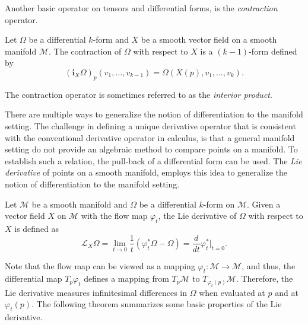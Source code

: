 Another basic operator on tensors and differential forms, is the \emph{contraction} operator.
\begin{definition}
	Let $\Omega$ be a differential $k$-form and $X$ be a smooth vector field on a smooth manifold $\mathcal M$. The contraction of $\Omega$ with respect to $X$ is a $(k-1)$-form defined by
\[
	(\mathbf i_{X}\Omega)_p(v_1,\dots,v_{k-1}) = \Omega(X(p),v_1,\dots,v_k).
\]
\end{definition}
The contraction operator is sometimes referred to as the \emph{interior product}.

There are multiple ways to generalize the notion of differentiation to the manifold setting. The challenge in defining a unique derivative operator that is consistent with the conventional derivative operator in calculus, is that a general manifold setting do not provide an algebraic method to compare points on a manifold. To establish such a relation, the pull-back of a differential form can be used. The \emph{Lie derivative} of points on a smooth manifold, employs this idea to generalize the notion of differentiation to the manifold setting.
\begin{definition}
Let $\mathcal M$ be a smooth manifold and $\Omega$ be a differential $k$-form on $\mathcal M$. Given a vector field $X$ on $\mathcal M$ with the flow map $\varphi_t$, the Lie derivative of $\Omega$ with respect to $X$ is defined as
\begin{equation} \label{eq:2.10}
	\mathcal L_X \Omega = \lim_{t\to 0} \frac 1 t (\varphi^*_t \Omega - \Omega) = \frac {d}{dt} \varphi^*_t |_{t=0}.
\end{equation}
\end{definition}
Note that the flow map can be viewed as a mapping $\varphi_t:\mathcal M \to \mathcal M$, and thus, the differential map $T_p \varphi _t$ defines a mapping from $T_p \mathcal M$ to $T_{ \varphi_t(p) } \mathcal M$. Therefore, the Lie derivative measures infinitesimal differences in $\Omega$ when evaluated at $p$ and at $\varphi_t(p)$. The following theorem summarizes some basic properties of the Lie derivative.

